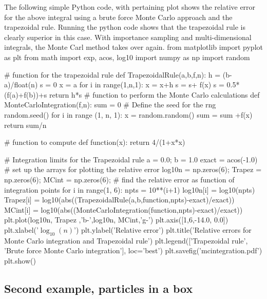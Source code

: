 \documentclass[%
oneside,                 %
final,                   %
10pt]{article}
\newenvironment{block_mdfboxadmon}[1][]{
\begin{block_mdfboxmdframed}[frametitle=#1]
}
{
\end{block_mdfboxmdframed}
}
\begin{document}
\begin{block_mdfboxadmon}[]
The following simple Python code, with pertaining plot shows the relative error for the above integral using a brute force Monte Carlo approach and the trapezoidal rule. Running the python code shows that the trapezoidal rule is clearly superior in this case. With importance sampling and multi-dimensional integrals, the Monte Carl method takes over again.
\bpypro
from  matplotlib import pyplot as plt
from math import exp, acos, log10
import numpy as np
import random

# function for the trapezoidal rule
def TrapezoidalRule(a,b,f,n):
   h = (b-a)/float(n)
   s = 0
   x = a
   for i in range(1,n,1):
       x = x+h
       s = s+ f(x)
   s = 0.5*(f(a)+f(b))+s
   return h*s
# function to perform the Monte Carlo calculations
def MonteCarloIntegration(f,n):
    sum = 0
# Define the seed for the rng
    random.seed()    
    for i in range (1, n, 1):
        x = random.random()
        sum = sum +f(x)
    return sum/n

#  function to compute
def function(x):
    return 4/(1+x*x)

# Integration limits for the Trapezoidal rule
a = 0.0; b = 1.0
exact = acos(-1.0)
# set up the arrays for plotting the relative error
log10n = np.zeros(6); Trapez = np.zeros(6); MCint = np.zeros(6);
# find the relative error as function of integration points
for i in range(1, 6):
    npts = 10**(i+1)
    log10n[i] = log10(npts)
    Trapez[i] = log10(abs((TrapezoidalRule(a,b,function,npts)-exact)/exact))
    MCint[i] = log10(abs((MonteCarloIntegration(function,npts)-exact)/exact))
plt.plot(log10n, Trapez ,'b-',log10n, MCint,'g-')
plt.axis([1,6,-14.0, 0.0])
plt.xlabel('$\log_{10}(n)$')
plt.ylabel('Relative error')
plt.title('Relative errors for Monte Carlo integration and Trapezoidal rule')
plt.legend(['Trapezoidal rule', 'Brute force Monte Carlo integration'], loc='best') 
plt.savefig('mcintegration.pdf')
plt.show()

\epypro
\end{block_mdfboxadmon} %




\subsection{Second example, particles in a box}
\end{document}
